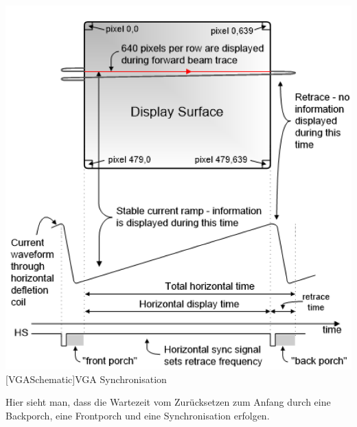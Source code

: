 \documentclass[12pt,a4paper,bibliography=totoc,listof=totoc]{scrartcl}
\begin{document}
\vspace{1em}
\begin{minipage}{\linewidth}
	\centering
	\includegraphics[width=0.8\linewidth]{pics/VGA_Erkl.png}
	[VGASchematic]{VGA Synchronisation}
	\label{fig:VGASchematic}
\end{minipage}

Hier sieht man, dass die Wartezeit vom Zurücksetzen zum Anfang durch eine Backporch, eine Frontporch und eine Synchronisation erfolgen.
\end{document}
